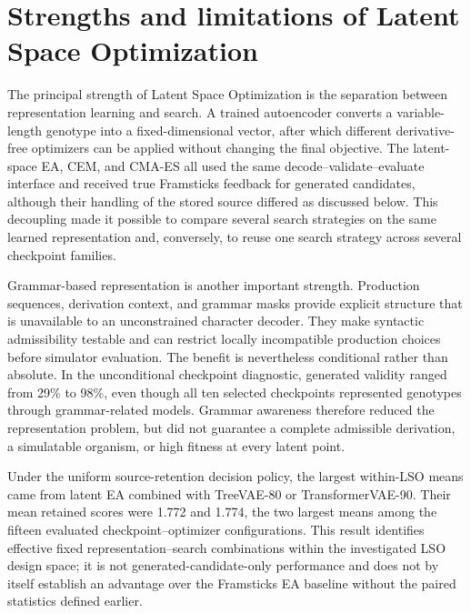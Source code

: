 \section{Strengths and limitations of Latent Space Optimization}

The principal strength of Latent Space Optimization is the separation between representation learning and search. A trained autoencoder converts a variable-length \fone{} genotype into a fixed-dimensional vector, after which different derivative-free optimizers can be applied without changing the final objective. The latent-space EA, CEM, and CMA-ES all used the same decode--validate--evaluate interface and received true Framsticks \vertpos{} feedback for generated candidates, although their handling of the stored source differed as discussed below. This decoupling made it possible to compare several search strategies on the same learned representation and, conversely, to reuse one search strategy across several checkpoint families.

Grammar-based representation is another important strength. Production sequences, derivation context, and grammar masks provide explicit structure that is unavailable to an unconstrained character decoder. They make syntactic admissibility testable and can restrict locally incompatible production choices before simulator evaluation. The benefit is nevertheless conditional rather than absolute. In the unconditional checkpoint diagnostic, generated validity ranged from 29\% to 98\%, even though all ten selected checkpoints represented \fone{} genotypes through grammar-related models. Grammar awareness therefore reduced the representation problem, but did not guarantee a complete admissible derivation, a simulatable organism, or high fitness at every latent point.

Under the uniform source-retention decision policy, the largest within-LSO means came from latent EA combined with TreeVAE-80 or TransformerVAE-90. Their mean retained scores were 1.772 and 1.774, the two largest means among the fifteen evaluated checkpoint--optimizer configurations. This result identifies effective fixed representation--search combinations within the investigated LSO design space; it is not generated-candidate-only performance and does not 
by itself establish an advantage over the Framsticks EA baseline without the paired statistics defined earlier.

